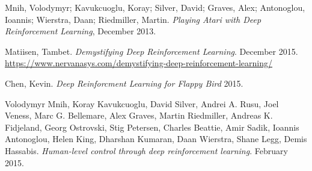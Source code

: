 \documentclass{article}
\begin{document}
\pagebreak
\begin{thebibliography}{9}

Mnih, Volodymyr; Kavukcuoglu, Koray; Silver, David; Graves, Alex; Antonoglou, Ioannis; Wierstra, Daan; Riedmiller, Martin.
\emph{Playing Atari with Deep Reinforcement Learning},
December 2013.

Matiisen, Tambet.
\emph{Demystifying Deep Reinforcement Learning}. December 2015.
\url{https://www.nervanasys.com/demystifying-deep-reinforcement-learning/}

Chen, Kevin.
\emph{Deep Reinforcment Learning for Flappy Bird}
2015.

Volodymyr Mnih,	Koray Kavukcuoglu,	David Silver, Andrei A. Rusu, Joel Veness, Marc G. Bellemare, Alex Graves,	Martin Riedmiller, Andreas K. Fidjeland, Georg Ostrovski, Stig Petersen, Charles Beattie, Amir Sadik, Ioannis Antonoglou,	Helen King,	Dharshan Kumaran, Daan Wierstra, Shane Legg, Demis Hassabis.
\emph{Human-level control through deep reinforcement learning}.
February 2015.

\end{thebibliography}
\end{document}

